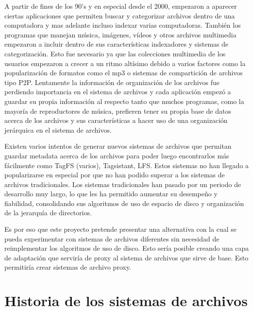 A partir de fines de los 90's y en especial desde el 2000, empezaron a aparecer ciertas aplicaciones que permiten buscar y categorizar archivos dentro de una computadora y mas adelante incluso indexar varias computadoras. También los programas que manejan música, imágenes, vídeos y otros archivos multimedia empezaron a incluir dentro de sus características indexadores y sistemas de categorización. Esto fue necesario ya que las colecciones multimedia de los usuarios empezaron a crecer a un ritmo altísimo debido a varios factores como la popularización de formatos como el mp3 o sistemas de compartición de archivos tipo P2P. Lentamente la información de organización de los archivos fue perdiendo importancia en el sistema de archivos y cada aplicación empezó a guardar su propia información al respecto tanto que muchos programas, como la mayoría de reproductores de música, prefieren tener su propia base de datos acerca de los archivos y sus características a hacer uso de una organización jerárquica en el sistema de archivos.

Existen varios intentos de generar nuevos sistemas de archivos que permitan guardar metadata acerca de los archivos para poder luego encontrarlos más fácilmente como TagFS (varios), Tagsistant, LFS. Estos sistemas no han llegado a popularizarse en especial por que no han podido superar a los sistemas de archivos tradicionales. Los sistemas tradicionales han pasado por un periodo de desarrollo muy largo, lo que les ha permitido aumentar su desempeño y fiabilidad, consolidando sus algoritmos de uso de espacio de disco y organización de la jerarquía de directorios.

Es por eso que este proyecto pretende presentar una alternativa con la cual se pueda experimentar con sistemas de archivos diferentes sin necesidad de reimplementar los algoritmos de uso de disco. Esto sería posible creando una capa de adaptación que serviría de proxy al sistema de archivos que sirve de base. Esto permitiría crear sistemas de archivo proxy.

\section{Historia de los sistemas de archivos}

